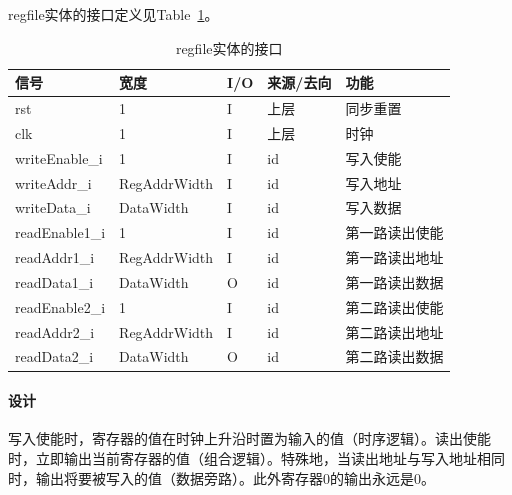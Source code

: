 \documentclass{article}
\begin{document}
\begin{spacing}{1.4}
regfile实体的接口定义见Table~\ref{tb:regfile-interface}。
\begin{table}[!htb]
\begin{center}
\begin{tabular*}{15cm}{l|l|l|l|p{5cm}}
\hline
\textbf{信号}&\textbf{宽度}&\textbf{I/O}&\textbf{来源/去向}&\textbf{功能} \\
\hline rst                     & 1                      & I     & 上层          & 同步重置 \\
\hline clk                     & 1                      & I     & 上层          & 时钟 \\
\hline writeEnable\_i          & 1                      & I     & id            & 写入使能 \\
\hline writeAddr\_i            & RegAddrWidth           & I     & id            & 写入地址 \\
\hline writeData\_i            & DataWidth              & I     & id            & 写入数据 \\
\hline readEnable1\_i          & 1                      & I     & id            & 第一路读出使能 \\
\hline readAddr1\_i            & RegAddrWidth           & I     & id            & 第一路读出地址 \\
\hline readData1\_i            & DataWidth              & O     & id            & 第一路读出数据 \\
\hline readEnable2\_i          & 1                      & I     & id            & 第二路读出使能 \\
\hline readAddr2\_i            & RegAddrWidth           & I     & id            & 第二路读出地址 \\
\hline readData2\_i            & DataWidth              & O     & id            & 第二路读出数据 \\
\hline
\end{tabular*}
\caption{regfile实体的接口}
\label{tb:regfile-interface}
\end{center}
\end{table}

\paragraph{设计}\mbox{}

写入使能时，寄存器的值在时钟上升沿时置为输入的值（时序逻辑）。读出使能时，立即输出当前寄存器的值（组合逻辑）。特殊地，当读出地址与写入地址相同时，输出将要被写入的值（数据旁路）。此外寄存器0的输出永远是0。


\end{spacing}
\end{document}
